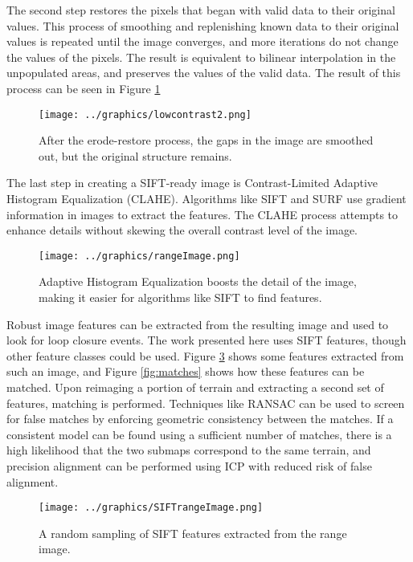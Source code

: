 The second step restores the pixels that began with valid data to their original values. This process of smoothing and replenishing known data to their original values is repeated until the image converges, and more iterations do not change the values of the pixels. The result is equivalent to bilinear interpolation in the unpopulated areas, and preserves the values of the valid data. The result of this process can be seen in Figure \ref{fig:rangeImage}

\begin{figure}[htb]
   \centering
   \texttt{[image: ../graphics/lowcontrast2.png]} %
   \caption{After the erode-restore process, the gaps in the image are smoothed out, but the original structure remains.}
   \label{fig:rangeImage}
\end{figure}

The last step in creating a SIFT-ready image is Contrast-Limited Adaptive Histogram Equalization (CLAHE). Algorithms like SIFT and SURF use gradient information in images to extract the features. The CLAHE process attempts to enhance details without skewing the overall contrast level of the image. \cite{clahe?}

\begin{figure}[htb]
   \centering
   \texttt{[image: ../graphics/rangeImage.png]} %
   \caption{Adaptive Histogram Equalization boosts the detail of the image, making it easier for algorithms like SIFT to find features.}
   \label{fig:rangeImageHC}
\end{figure}

Robust image features can be extracted from the resulting image and used to look for loop closure events. The work presented here uses SIFT features, though other feature classes could be used. Figure \ref{fig:SIFTrangeImage} shows some features extracted from such an image, and Figure \ref{fig:matches} shows how these features can be matched. Upon reimaging a portion of terrain and extracting a second set of features, matching is performed. Techniques like RANSAC can be used to screen for false matches by enforcing geometric consistency between the matches. If a consistent model can be found using a sufficient number of matches, there is a high likelihood that the two submaps correspond to the same terrain, and precision alignment can be performed using ICP with reduced risk of false alignment. 

\begin{figure}[htb]
   \centering
   \texttt{[image: ../graphics/SIFTrangeImage.png]} %
   \caption{A random sampling of SIFT features extracted from the range image.}
   \label{fig:SIFTrangeImage}
\end{figure}

